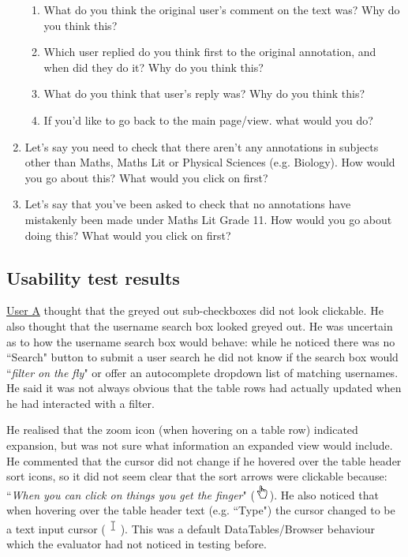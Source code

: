 \begin{enumerate}
\begin{enumerate}
 \item What do you think the original user's comment on the text was? Why do you think this?
 \item Which user replied do you think first to the original annotation, and when did they do it? Why do you think this?
 \item What do you think that user's reply was? Why do you think this?
 \item If you'd like to go back to the main page/view. what would you do?
 \end{enumerate}
 \item Let's say you need to check that there aren't any annotations in subjects other than Maths, Maths Lit or Physical Sciences (e.g. Biology). How would you go about this? What would you click on first?
 \item Let's say that you've been asked to check that no annotations have mistakenly been made under Maths Lit Grade 11. How would you go about doing this? What would you click on first? 
 \end{enumerate}
 

\subsection{Usability test results}
\underline{User A} thought that the greyed out sub-checkboxes did not look clickable. He also thought that the username search box looked greyed out. He was uncertain as to how the username search box would behave: while he noticed there was no ``Search" button to submit a user search he did not know if the search box would ``\textit{filter on the fly}" or offer an autocomplete dropdown list of matching usernames. He said it was not always obvious that the table rows had actually updated when he had interacted with a filter.

He realised that the zoom icon (when hovering on a table row) indicated expansion, but was not sure what information an expanded view would include. He commented that the cursor did not change if he hovered over the table header sort icons, so it did not seem clear that the sort arrows were clickable because: ``\textit{When you can click on things you get the finger}" (\includegraphics[width=0.5cm]{Figures/handcursor.png}). He also noticed that when hovering over the table header text (e.g. ``Type") the cursor changed to be a text input cursor (\includegraphics[width=0.5cm]{Figures/textcursor.png}). This was a default DataTables/Browser behaviour which the evaluator had not noticed in testing before.

